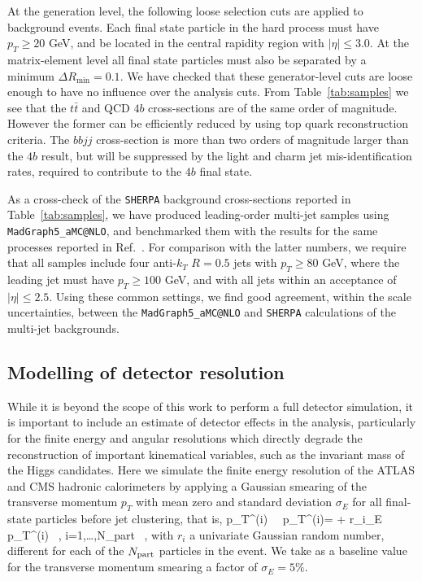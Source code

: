 At the generation level, the following loose selection 
cuts are applied to
background events.
%
Each final state particle in the hard process must have $p_T \ge 20$ GeV, and be located
in the central  rapidity
region with
$| \eta | \le 3.0$.
%
At the matrix-element level
all final state particles must also be separated by a minimum $\Delta R_{\mathrm{min}} =0.1$.
%
We have checked that these generator-level cuts are loose enough to have
no influence over the analysis cuts.
%
From Table~\ref{tab:samples}
we see that the $t\bar{t}$ and QCD $4b$ cross-sections are of
the same order of magnitude. However the former can be efficiently
reduced by using top quark reconstruction criteria.
%
The $bbjj$ cross-section is more than two orders
of magnitude larger than the $4b$ result, but will be suppressed
by the light and charm jet mis-identification rates,
required to contribute to the $4b$ final state.

 
 


As a cross-check of the {\tt SHERPA}
background cross-sections reported in Table~\ref{tab:samples}, we have produced leading-order
multi-jet samples
using {\tt MadGraph5\_aMC@NLO}, and
benchmarked them with the results for the same processes reported in
Ref.~\cite{Alwall:2014hca}.
%
For comparison with the latter numbers, 
we require that all samples include four anti-$k_T$ $R=0.5$ jets with $p_T \ge 80 $ GeV, where the leading jet must have $p_T \ge 100$ GeV, and with all jets within an acceptance of $|\eta| \le 2.5 $.
%
Using these common settings,
we find good agreement,
within the scale uncertainties, between the
{\tt MadGraph5\_aMC@NLO} and {\tt SHERPA} calculations of the multi-jet
backgrounds.


\subsection{Modelling of detector resolution}
\label{sec:detectormodeling}

While it is beyond the scope of this work to perform a full
detector simulation, it is important to include an estimate of detector
effects in the analysis, particularly for the finite energy
and angular resolutions which directly
degrade the reconstruction of important kinematical variables, such as
the invariant mass of the Higgs candidates.
%
Here we simulate the finite energy resolution of the ATLAS and CMS
hadronic calorimeters by applying a Gaussian smearing of the transverse
momentum $p_T$ with mean zero and standard deviation $\sigma_E$ for all
final-state particles before jet clustering, that is,
%
\be
\label{eq:smearing}
p_T^{(i)} \, \to \, p_T^{(i)\prime}= + r_i\cdot\sigma_E \rp\, p_T^{(i)} \, , \quad
i=1,\ldots,N_{\rm part} \, ,
\ee
with $r_i$ a univariate Gaussian random number, different for each
of the $N_{\rm part}$ particles in the event.
%
We take as a baseline value for the transverse momentum smearing a
factor of $\sigma_E=5\%$.
%

